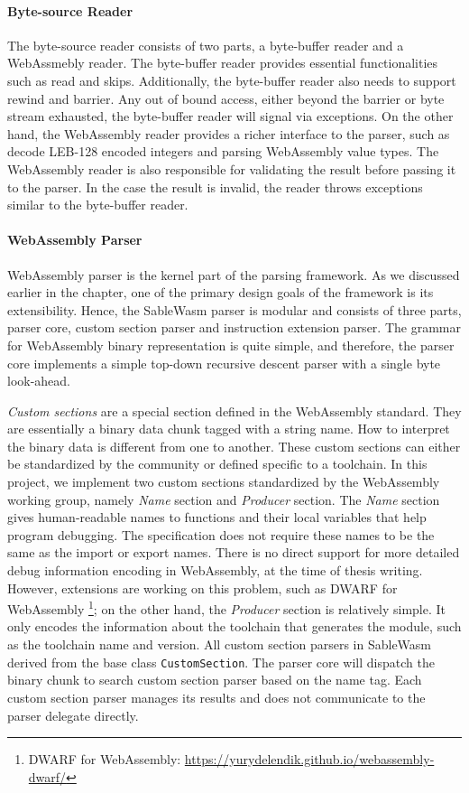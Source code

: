 \paragraph{Byte-source Reader}
The byte-source reader consists of two parts, a byte-buffer reader and a WebAssmebly reader. The byte-buffer reader provides essential functionalities such as read and skips. Additionally, the byte-buffer reader also needs to support rewind and barrier. Any out of bound access, either beyond the barrier or byte stream exhausted, the byte-buffer reader will signal via exceptions. On the other hand, the WebAssembly reader provides a richer interface to the parser, such as decode LEB-128 encoded integers and parsing WebAssembly value types. The WebAssembly reader is also responsible for validating the result before passing it to the parser. In the case the result is invalid, the reader throws exceptions similar to the byte-buffer reader.

\paragraph{WebAssembly Parser}
WebAssembly parser is the kernel part of the parsing framework. As we discussed earlier in the chapter, one of the primary design goals of the framework is its extensibility. Hence, the SableWasm parser is modular and consists of three parts, parser core, custom section parser and instruction extension parser. The grammar for WebAssembly binary representation is quite simple, and therefore, the parser core implements a simple top-down recursive descent parser with a single byte look-ahead.

\emph{Custom sections} are a special section defined in the WebAssembly standard. They are essentially a binary data chunk tagged with a string name. How to interpret the binary data is different from one to another. These custom sections can either be standardized by the community or defined specific to a toolchain. In this project, we implement two custom sections standardized by the WebAssembly working group, namely \emph{Name} section and \emph{Producer} section. The \emph{Name} section gives human-readable names to functions and their local variables that help program debugging. The specification does not require these names to be the same as the import or export names. There is no direct support for more detailed debug information encoding in WebAssembly, at the time of thesis writing. However, extensions are working on this problem, such as DWARF for WebAssembly \footnote{DWARF for WebAssembly: \url{https://yurydelendik.github.io/webassembly-dwarf/}}; on the other hand, the \emph{Producer} section is relatively simple. It only encodes the information about the toolchain that generates the module, such as the toolchain name and version. All custom section parsers in SableWasm derived from the base class \texttt{CustomSection}. The parser core will dispatch the binary chunk to search custom section parser based on the name tag. Each custom section parser manages its results and does not communicate to the parser delegate directly. 

